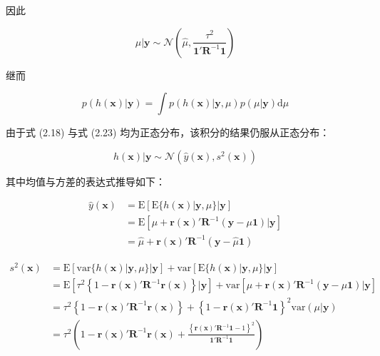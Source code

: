 \documentclass{ctexart}
\begin{document}
因此

\begin{equation*}
\mu|\boldsymbol{y}\sim\mathcal{N}\left(\widehat{\mu},\frac{\tau^{2}}{\boldsymbol{1}'\boldsymbol{R}^{-1}\boldsymbol{1}}\right)
\tag{2.23}
\end{equation*}

继而

\begin{equation*}
p(h(\boldsymbol{x})|\boldsymbol{y})=\int p(h(\boldsymbol{x})|\boldsymbol{y},\mu)p(\mu|\boldsymbol{y})\mathrm{d}\mu
\end{equation*}

由于式 (2.18) 与式 (2.23) 均为正态分布，该积分的结果仍服从正态分布：

\begin{equation*}
h(\boldsymbol{x})|\boldsymbol{y}\sim\mathcal{N}\left(\widehat{y}(\boldsymbol{x}),s^2(\boldsymbol{x})\right)
\tag{2.24}
\end{equation*}

其中均值与方差的表达式推导如下：

\begin{align*}
\widehat{y}(\boldsymbol{x})
&=\mathrm{E}\left[\mathrm{E}\{h(\boldsymbol{x})|\boldsymbol{y},\mu\}|\boldsymbol{y}\right]\\
&=\mathrm{E}\left[\mu+\boldsymbol{r}(\boldsymbol{x})'\boldsymbol{R}^{-1}(\boldsymbol{y}-\mu\boldsymbol{1})|\boldsymbol{y}\right]\\
&=\widehat{\mu}+\boldsymbol{r}(\boldsymbol{x})'\boldsymbol{R}^{-1}(\boldsymbol{y}-\widehat{\mu}\boldsymbol{1})
\tag{2.25}
\end{align*}

\begin{align*}
s^2(\boldsymbol{x})
&=\mathrm{E}\left[\mathrm{var}\{h(\boldsymbol{x})|\boldsymbol{y},\mu\}|\boldsymbol{y}\right]+\mathrm{var}\left[\mathrm{E}\{h(\boldsymbol{x})|\boldsymbol{y},\mu\}|\boldsymbol{y}\right]\\
&=\mathrm{E}\left[\tau^2\left\{1-\boldsymbol{r}(\boldsymbol{x})'\boldsymbol{R}^{-1}\boldsymbol{r}(\boldsymbol{x})\right\}|\boldsymbol{y}\right]+\mathrm{var}\left[\mu+\boldsymbol{r}(\boldsymbol{x})'\boldsymbol{R}^{-1}(\boldsymbol{y}-\mu\boldsymbol{1})|\boldsymbol{y}\right]\\
&=\tau^2\left\{1-\boldsymbol{r}(\boldsymbol{x})'\boldsymbol{R}^{-1}\boldsymbol{r}(\boldsymbol{x})\right\}+\left\{1-\boldsymbol{r}(\boldsymbol{x})'\boldsymbol{R}^{-1}\boldsymbol{1}\right\}^2\mathrm{var}(\mu|\boldsymbol{y})\\
&=\tau^2\left(1-\boldsymbol{r}(\boldsymbol{x})'\boldsymbol{R}^{-1}\boldsymbol{r}(\boldsymbol{x})+\frac{\left\{\boldsymbol{r}(\boldsymbol{x})'\boldsymbol{R}^{-1}\boldsymbol{1}-1\right\}^2}{\boldsymbol{1}'\boldsymbol{R}^{-1}\boldsymbol{1}}\right)
\tag{2.26}
\end{align*}
\end{document}
